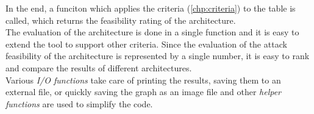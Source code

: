 In the end, a funciton which applies the criteria (\ref{chp:criteria}) to the table is called, which returns the feasibility rating of the architecture.\\
The evaluation of the architecture is done in a single function and it is easy to extend the tool to support other criteria.
Since the evaluation of the attack feasibility of the architecture is represented by a single number, 
it is easy to rank and compare the results of different architectures.\\

Various \textit{I/O functions} take care of printing the results, saving them to an external file, or quickly saving the graph as an image file
and other \textit{helper functions} are used to simplify the code.